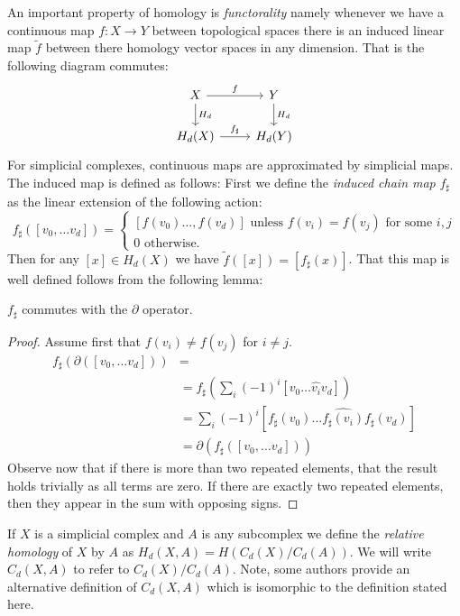 An important property of homology is \emph{functorality} namely whenever we have a continuous map $f: X \rightarrow Y$ between topological spaces there is an induced linear map $\tilde{f}$ between there homology vector spaces in any dimension. That is the following diagram commutes:
\[ \begin{tikzcd}
X \arrow{r}{f}\arrow{d}{H_d} & Y \arrow{d}{H_d} \\
H_d(X) \arrow{r}{f_{\sharp}} & H_d(Y)
\end{tikzcd} \]
For simplicial complexes, continuous maps are approximated by simplicial maps. The induced map is defined as follows: First we define the \emph{induced chain map} $f_\sharp$ as the linear extension of the following action: 
\[ f_\sharp([v_0, \ldots v_d]) = 
\begin{cases} 
    [f(v_0) \ldots, f(v_d)] \textrm{ unless } f(v_i) = f(v_j) \textrm{ for some } i,j \\
    0 \textrm{ otherwise. }
   \end{cases}
\]
Then for any $[x] \in H_d(X)$ we have $\tilde{f}([x]) = [f_{\sharp}(x)]$.  That this map is well defined follows from 
the following lemma:
\begin{lemma}
$f_\sharp$ commutes with the $\partial$ operator. 
\end{lemma}
\begin{proof}
Assume first that $f(v_i) \neq f(v_j)$ for $i \neq j$.
\begin{align*}
f_\sharp(\partial([v_0, \ldots v_d])) &= \\
&= f_{\sharp}(\sum_i (-1)^i[v_0 \ldots \hat{v_i} v_d])  \\
&=  \sum_i(-1)^i [f_{\sharp}(v_0) \ldots \hat{f_{\sharp}(v_i)} f_{\sharp}(v_d)] \\
&=  \partial(f_\sharp([v_0, \ldots v_d]))
\end{align*}
Observe now that if there is more than two repeated elements, that the result holds trivially as all terms are zero. If there are exactly two repeated elements, then they appear
in the sum with opposing signs.
\end{proof}

If $X$ is a simplicial complex and $A$ is any subcomplex we define the \emph{relative homology} of $X$ by $A$ as $H_d(X,A) = H(C_d(X)/C_d(A))$. We will write $C_d(X,A)$ to refer to $C_d(X)/C_d(A)$. Note, some authors provide an alternative definition of $C_d(X,A)$ which is isomorphic to the definition stated here.

